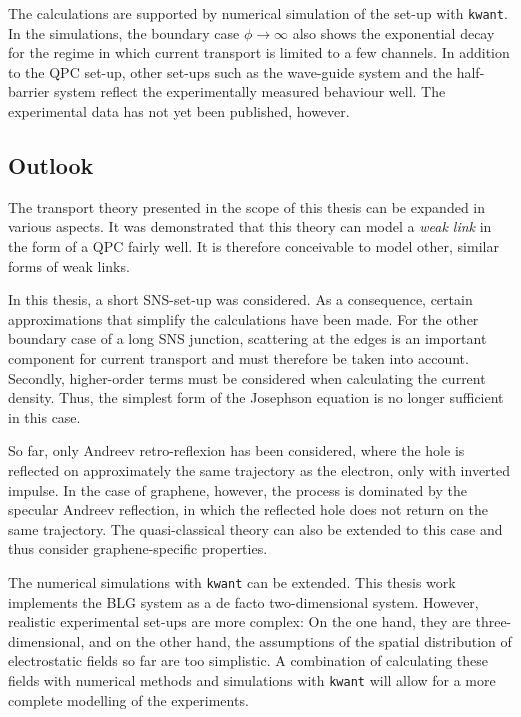 The calculations are supported by numerical simulation of the set-up with \texttt{kwant}. In the simulations, the boundary case $\phi \rightarrow \infty$ also shows the exponential decay for the regime in which current transport is limited to a few channels. In addition to the QPC set-up, other set-ups such as the wave-guide system and the half-barrier system reflect the experimentally measured behaviour well. The experimental data has not yet been published, however.

 
\subsection*{Outlook}

The transport theory presented in the scope of this thesis can be expanded in various aspects. It was demonstrated that this theory can model a \emph{weak link} in the form of a QPC fairly well. It is therefore conceivable to model other, similar forms of weak links.

In this thesis, a short SNS-set-up was considered. As a consequence, certain approximations that simplify the calculations have been made.  For the other boundary case of a long SNS junction, scattering at the edges is an important component for current transport and must therefore be taken into account. Secondly, higher-order terms must be considered when calculating the current density. Thus, the simplest form of the Josephson equation is no longer sufficient in this case. 

So far, only Andreev retro-reflexion has been considered, where the hole is reflected on approximately the same trajectory as the electron, only with inverted impulse. In the case of graphene, however, the process is dominated by the specular Andreev reflection, in which the reflected hole does not return on the same trajectory. The quasi-classical theory can also be extended to this case and thus consider graphene-specific properties.

The numerical simulations with \texttt{kwant} can be extended. This thesis work implements the BLG system as a de facto two-dimensional system. However, realistic experimental set-ups are more complex: On the one hand, they are three-dimensional, and on the other hand, the assumptions of the spatial distribution of electrostatic fields so far are too simplistic. A combination of calculating these fields with numerical methods and simulations with \texttt{kwant} will allow for a more complete modelling of the experiments. 








